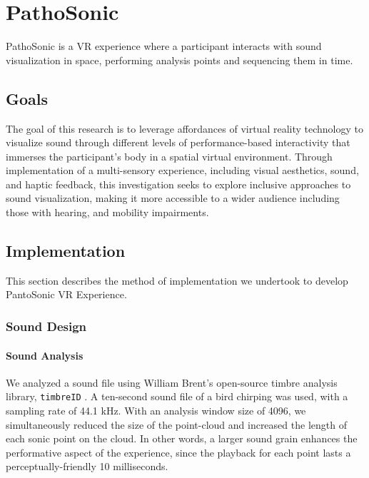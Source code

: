 \documentclass{nime-alternate}
\begin{document}
\section{PathoSonic}

PathoSonic is a VR experience where a participant interacts with sound visualization in space, performing analysis points and sequencing them in time.

\subsection{Goals}
The goal of this research is to leverage affordances of virtual reality technology to visualize sound through different levels of performance-based interactivity that immerses the participant's body in a spatial virtual environment. Through implementation of a multi-sensory experience, including visual aesthetics, sound, and haptic feedback, this investigation seeks to explore inclusive approaches to sound visualization, making it more accessible to a wider audience including those with hearing, and mobility impairments.


\subsection{Implementation}

This section describes the method of implementation we undertook to develop PantoSonic VR Experience.

\subsubsection{Sound Design}

\paragraph{Sound Analysis} We analyzed a sound file using William Brent's open-source timbre analysis library, \texttt{timbreID} \cite{icmc/bbp2372.2010.044}. A ten-second sound file of a bird chirping was used, with a sampling rate of 44.1 kHz. With an analysis window size of 4096, we simultaneously reduced the size of the point-cloud and increased the length of each sonic point on the cloud. In other words, a larger sound grain enhances the performative aspect of the experience, since the playback for each point lasts a perceptually-friendly 10 milliseconds.
\end{document}
